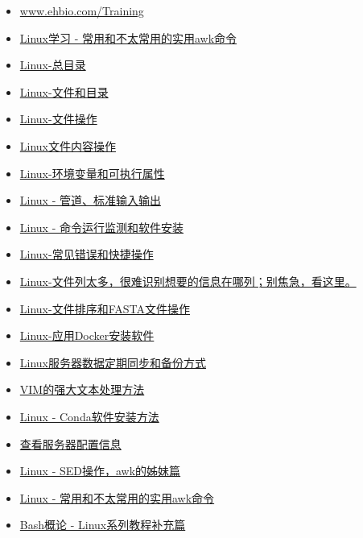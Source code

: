 \documentclass[]{article}
\providecommand{\tightlist}{%
  \setlength{\itemsep}{0pt}\setlength{\parskip}{0pt}}
\numberwithin{figure}{section}
\numberwithin{table}{section}
\begin{document}
\begin{itemize}
\tightlist
\item
  \url{www.ehbio.com/Training}
\item
  \href{http://mp.weixin.qq.com/s/8wD14FXt7fLDo1BjJyT0ew}{Linux学习 - 常用和不太常用的实用awk命令}
\item
  \href{http://mp.weixin.qq.com/s/hEYU80fPf1eD5OWL3fO4Bg}{Linux-总目录}
\item
  \href{http://mp.weixin.qq.com/s/yKP1Kboji9N4p2Sl1Ovj0Q}{Linux-文件和目录}
\item
  \href{http://mp.weixin.qq.com/s/4bYMzJclf_xHpqdrlbvAdA}{Linux-文件操作}
\item
  \href{http://mp.weixin.qq.com/s/QFgINAYcQA9kYYSA28wK-Q}{Linux文件内容操作}
\item
  \href{http://mp.weixin.qq.com/s/poFpNHQgHDr0qr2wqfVNdw}{Linux-环境变量和可执行属性}
\item
  \href{http://mp.weixin.qq.com/s/zL9Mw_2ig48gHrIjKM0CMw}{Linux - 管道、标准输入输出}
\item
  \href{http://mp.weixin.qq.com/s/TNU7X2mhfVVffaJ7NRBuNA}{Linux - 命令运行监测和软件安装}
\item
  \href{http://mp.weixin.qq.com/s/cDIN4_R4nETEB5irmIGFAQ}{Linux-常见错误和快捷操作}
\item
  \href{http://mp.weixin.qq.com/s/1QaroFE7AH1pREuq-k2YAw}{Linux-文件列太多，很难识别想要的信息在哪列；别焦急，看这里。}
\item
  \href{http://mp.weixin.qq.com/s/R1OHRhZoDJuAdyVdJr2xHg}{Linux-文件排序和FASTA文件操作}
\item
  \href{http://mp.weixin.qq.com/s/HLHiWMLaWtB7SOJe_jP3mA}{Linux-应用Docker安装软件}
\item
  \href{http://mp.weixin.qq.com/s/c2cspK5b4sQScWYMBtG63g}{Linux服务器数据定期同步和备份方式}
\item
  \href{https://mp.weixin.qq.com/s/4lUiZ60-aXLilRk9--iQhA}{VIM的强大文本处理方法}
\item
  \href{http://mp.weixin.qq.com/s/A4_j8ZbyprMr1TT_wgisQQ}{Linux - Conda软件安装方法}
\item
  \href{http://mp.weixin.qq.com/s/xq0JfkHJJeHQk1acjOAJUQ}{查看服务器配置信息}
\item
  \href{http://mp.weixin.qq.com/s/cywkIeRbhkYTZvkwTeIVSA}{Linux - SED操作，awk的姊妹篇}
\item
  \href{http://mp.weixin.qq.com/s/8wD14FXt7fLDo1BjJyT0ew}{Linux - 常用和不太常用的实用awk命令}
\item
  \href{http://mp.weixin.qq.com/s/lWNp_6W_jLiogmtlk9nO2A}{Bash概论 - Linux系列教程补充篇}

\end{itemize}
\end{document}
